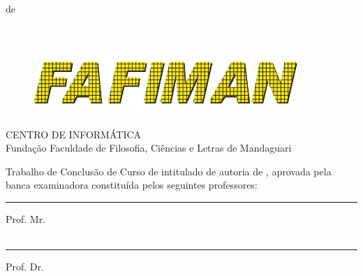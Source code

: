 \documentclass{tcc}
\begin{document}
\vfill
\begin{center}
\MONTH de \the\year
\end{center}

\newpage

$ $
\vfill


\begin{flushright}
\end{flushright}

\newpage

\begin{figure}[H]
\centering
\includegraphics[width=100mm]{imagens/logo3.jpg}
\end{figure}

\begin{center}
CENTRO DE INFORMÁTICA \\
Fundação Faculdade de Filosofia, Ciências e Letras de Mandaguari
\end{center}

\vspace{0.05in}

Trabalho de Conclusão de Curso de \nomedocurso intitulado \textit{\bf \em \thetitle} de autoria de \theauthor, aprovada pela banca examinadora constituída pelos seguintes professores: \\

\vspace{0.7in}

\hrule
\noindent Prof. Mr. \profb\\
\insta\\

\vspace{0.25in}

\hrule
\noindent Prof. Dr. \profb\\
\instb\\
\end{document}
